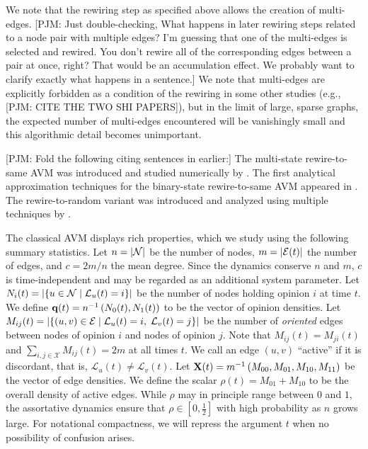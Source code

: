 \documentclass[review, onefignum, onetabnum]{siamart171218}
\newcommand{\pjm}[1]{{\color{blue}[PJM: #1]}}
\begin{document}
	We note that the rewiring step as specified above allows the creation of multi-edges. \pjm{Just double-checking, What happens in later rewiring steps related to a node pair with multiple edges? I'm guessing that one of the multi-edges is selected and rewired. You don't rewire all of the corresponding edges between a pair at once, right? That would be an accumulation effect. We probably want to clarify exactly what happens in a sentence.} We note that multi-edges are explicitly forbidden as a condition of the rewiring in some other studies (e.g., \pjm{CITE THE TWO SHI PAPERS}), but in the limit of large, sparse graphs, the expected number of multi-edges encountered will be vanishingly small and this algorithmic detail becomes unimportant. 

\pjm{Fold the following citing sentences in earlier:} The multi-state rewire-to-same AVM was introduced and studied numerically by \cite{Holme2006}.
	The first analytical approximation techniques for the binary-state rewire-to-same AVM appeared in \cite{Kimura2008}. 
	The rewire-to-random variant was introduced and analyzed using multiple techniques by \cite{Durrett2012}.  

	The classical AVM displays rich properties, which we study using the following summary statistics. 
	Let $n = \left|\mathcal{N}\right|$ be the number of nodes, $m = \left|\mathcal{E}(t)\right|$ the number of edges, and $c = {2m}/{n}$ the mean degree.
	Since the dynamics conserve $n$ and $m$, $c$ is time-independent and may be regarded as an additional system parameter. 
	Let $N_i(t) = \left|\{u \in \mathcal{N} \;|\;\mathcal{L}_u(t) = i \}\right|$ be the number of nodes holding opinion $i$ at time $t$. 
	We define $\mathbf{q}(t) = n^{-1}\left(N_0(t), N_1(t)\right)$ to be the vector of opinion densities.
	Let $M_{ij}(t) = \left|\{(u,v) \in \mathcal{E} \;|\; \mathcal{L}_u(t) = i,\; \mathcal{L}_v(t) = j \}\right|$ be the number of \emph{oriented} edges between nodes of opinion $i$ and nodes of opinion $j$. 
	Note that $M_{ij}(t) = M_{ji}(t)$ and $\sum_{i,j \in \mathcal{X}} M_{ij}(t) = 2m$ at all times $t$.
	We call an edge $(u,v)$ ``active'' if it is discordant, that is, $\mathcal{L}_u(t) \neq \mathcal{L}_v(t)$. 
	Let $\mathbf{X}(t) = m^{-1}\left(M_{00}, M_{01}, M_{10}, M_{11}\right)$ be the vector of edge densities. 
	We define the scalar $\rho(t) = M_{01} + M_{10}$ to be the overall density of active edges. 
	While $\rho$ may in principle range between $0$ and $1$, the assortative dynamics ensure that $\rho \in [0,\frac{1}{2}]$ with high probability as $n$ grows large. 
	For notational compactness, we will repress the argument $t$ when no possibility of confusion arises.
\end{document}

